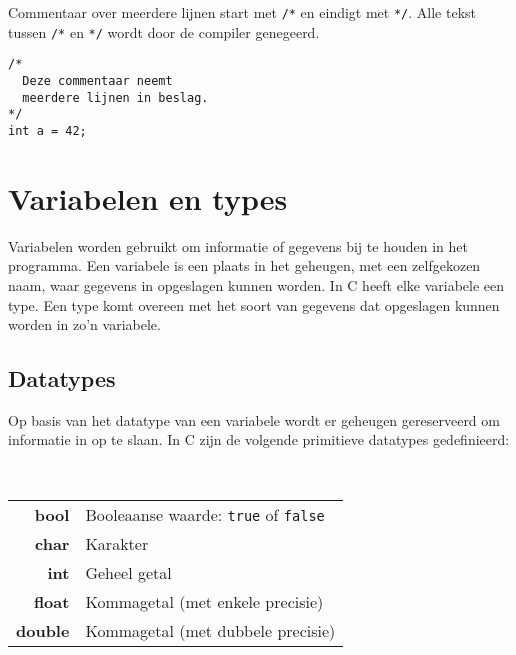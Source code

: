 \documentclass[11pt,fleqn]{book} %
\def\Cpp{{C\nolinebreak[4]\hspace{-.05em}\raisebox{.4ex}{\tiny\bf ++}}}
\begin{document}
\noindent Commentaar over meerdere lijnen start met \texttt{/*} en eindigt met \texttt{*/}. Alle tekst tussen \texttt{/*} en \texttt{*/} wordt door de compiler genegeerd.

\begin{example}
	\phantom{ }
	\begin{verbatim}
/*
  Deze commentaar neemt
  meerdere lijnen in beslag.
*/
int a = 42;
	\end{verbatim}
\end{example}

\chapter{Variabelen en types}
Variabelen worden gebruikt om informatie of gegevens bij te houden in het programma. Een variabele is een plaats in het geheugen, met een zelfgekozen naam, waar gegevens in opgeslagen kunnen worden. In \Cpp{} heeft elke variabele een type. Een type komt overeen met het soort van gegevens dat opgeslagen kunnen worden in zo'n variabele.

\section{Datatypes}
\label{section:datatypes}

Op basis van het datatype van een variabele wordt er geheugen gereserveerd om informatie in op te slaan. In \Cpp{} zijn de volgende primitieve datatypes gedefinieerd:

\begin{definition}
	\label{definition:primitieve-datatypes}
	\phantom{ } \\
	\begin{minipage}{\columnwidth}
		\vspace{0.1cm}
		\begin{tabular}{rl}
			\textbf{bool} & Booleaanse waarde: \texttt{true} of \texttt{false} \\
			\textbf{char} & Karakter \\
			\textbf{int} & Geheel getal \\
			\textbf{float} & Kommagetal (met enkele precisie) \\
			\textbf{double} & Kommagetal (met dubbele precisie)
		\end{tabular}
		\vspace{0.1cm}
	\end{minipage}
\end{definition}
\end{document}
